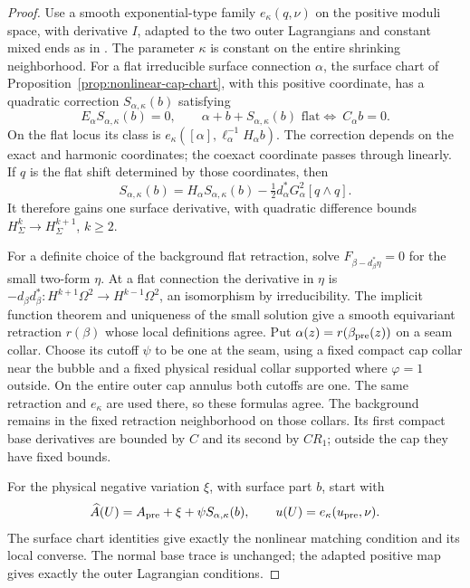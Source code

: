 \documentclass[11pt]{amsart}
\theoremstyle{definition}
\theoremstyle{remark}
\theoremstyle{plain}
\begin{document}
\begin{proof}
Use a smooth exponential-type family $e_\kappa(q,\nu)$ on the
positive moduli space, with derivative $I$, adapted to the two
outer Lagrangians and constant mixed ends as in
\cite[Lemma~4.4]{DaeFukLip21a}. The parameter $\kappa$ is
constant on the entire shrinking neighborhood. For a flat irreducible
surface connection $\alpha$, the surface chart of
Proposition~\ref{prop:nonlinear-cap-chart}, with this positive
coordinate, has a quadratic correction $S_{\alpha,\kappa}(b)$
satisfying
\[
 E_\alpha S_{\alpha,\kappa}(b)=0,\qquad
 \alpha+b+S_{\alpha,\kappa}(b)\text{ flat} \Longleftrightarrow\ C_\alpha b=0.
\]
On the flat locus its class is
$e_\kappa([\alpha],\ell_\alpha^{-1}H_\alpha b)$.
The correction depends on the exact and harmonic coordinates; the
coexact coordinate passes through linearly. If $q$ is the flat
shift determined by those coordinates, then
\begin{equation}\label{eq:gluing-chart-surface-gain}
 S_{\alpha,\kappa}(b)=H_\alpha S_{\alpha,\kappa}(b)
                              -\tfrac12d_\alpha^*G^2_\alpha[q\wedge q].
\end{equation}
It therefore gains one surface derivative, with quadratic difference
bounds $H^k_\Sigma\to H^{k+1}_\Sigma$, $k\geq2$.

For a definite choice of the background flat retraction, solve
$F_{\beta-d_\beta^*\eta}=0$ for the small two-form $\eta$.
At a flat connection the derivative in $\eta$ is
$-d_\beta d_\beta^*:H^{k+1}\Omega^2\to H^{k-1}\Omega^2$,
an isomorphism by irreducibility. The implicit function theorem
and uniqueness of the small solution give a smooth equivariant
retraction $r(\beta)$ whose local definitions agree. Put
$\alpha(z)=r(\beta_{\rm pre}(z))$ on a seam collar. Choose
its cutoff $\psi$ to be one at the seam, using a fixed compact
cap collar near the bubble and a fixed physical residual collar
supported where $\varphi=1$ outside. On the entire outer cap
annulus both cutoffs are one. The same retraction and $e_\kappa$
are used there, so these formulas agree. The background remains
in the fixed retraction neighborhood on those collars. Its first
compact base derivatives are bounded by $C$ and its second by
$CR_1$; outside the cap they have fixed bounds.

For the physical negative variation $\xi$, with surface part $b$,
start with
\[
 \widehat A(U)=A_{\rm pre}+\xi+\psi S_{\alpha,\kappa}(b),
                     \qquad u(U)=e_\kappa(u_{\rm pre},\nu).
\]
The surface chart identities give exactly the nonlinear matching
condition and its local converse. The normal base trace is unchanged;
the adapted positive map gives exactly the outer Lagrangian conditions.


\end{proof}
\end{document}
